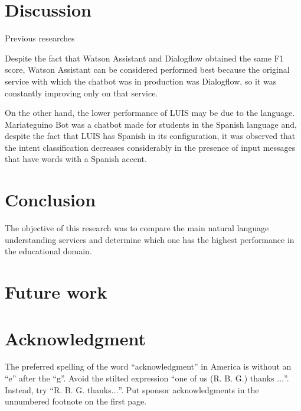 \documentclass[conference]{IEEEtran}
\begin{document}
\section{Discussion}

Previous researches

Despite the fact that Watson Assistant and Dialogflow obtained the same F1 score, Watson Assistant can be considered performed   best because the original service with which the chatbot was in production was Dialogflow, so it was constantly improving only on that service.

On the other hand, the lower performance of LUIS may be due to the language. Mariateguino Bot was a chatbot made for students in the Spanish language and, despite the fact that LUIS has Spanish in its configuration, it was observed that the intent classification decreases considerably in the presence of input messages that have words with a Spanish accent.

\section{Conclusion}
The objective of this research was to compare the main natural language understanding services and determine which one has the highest performance in the educational domain.
\section{Future work}

\section*{Acknowledgment}

The preferred spelling of the word ``acknowledgment'' in America is without
an ``e'' after the ``g''. Avoid the stilted expression ``one of us (R. B.
G.) thanks $\ldots$''. Instead, try ``R. B. G. thanks$\ldots$''. Put sponsor
acknowledgments in the unnumbered footnote on the first page.



\end{document}
